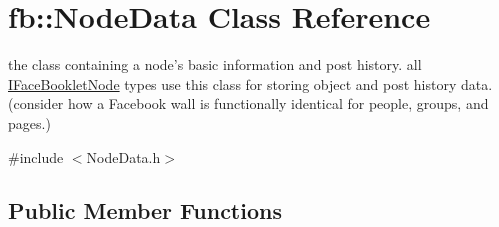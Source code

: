 \hypertarget{classfb_1_1_node_data}{\section{fb\+:\+:Node\+Data Class Reference}
\label{classfb_1_1_node_data}
}


the class containing a node's basic information and post history.  all \hyperlink{structfb_1_1_i_face_booklet_node}{I\+Face\+Booklet\+Node} types use this class for storing object and post history data. (consider how a Facebook wall is functionally identical for people, groups, and pages.)  




{\ttfamily \#include $<$Node\+Data.\+h$>$}

\subsection*{Public Member Functions}
